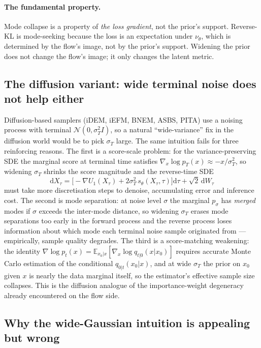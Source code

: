 \documentclass[11pt,letterpaper]{article}
\newcommand{\E}{\mathbb{E}}
\newcommand{\dd}{\mathrm{d}}
\theoremstyle{plain}
\begin{document}
\paragraph{The fundamental property.} Mode collapse is a property of
\emph{the loss gradient}, not the prior's support. Reverse-KL is mode-seeking
because the loss is an expectation under $\nu_\theta$, which is determined by
the flow's image, not by the prior's support. Widening the prior does not
change the flow's image; it only changes the latent metric.

\subsection{The diffusion variant: wide terminal noise does not help either}

Diffusion-based samplers (iDEM, iEFM, BNEM, ASBS, PITA) use a noising process
with terminal $\mathcal N(0,\sigma_T^2 I)$, so a natural ``wide-variance''
fix in the diffusion world would be to pick $\sigma_T$ large. The same
intuition fails for three reinforcing reasons. The first is a score-scale
problem: for the variance-preserving SDE the marginal score at terminal time
satisfies $\nabla_x\log p_T(x)\approx -x/\sigma_T^2$, so widening $\sigma_T$
shrinks the score magnitude and the reverse-time SDE
\[
  \dd X_\tau = \big[-\nabla U_1(X_\tau) + 2\sigma_T^2\,s_\theta(X_\tau,\tau)\big]\dd\tau + \sqrt{2}\,\dd W_\tau
\]
must take more discretisation steps to denoise, accumulating error and
inference cost. The second is mode separation: at noise level $\sigma$ the
marginal $p_\sigma$ has \emph{merged} modes if $\sigma$ exceeds the inter-mode
distance, so widening $\sigma_T$ erases mode separations too early in the
forward process and the reverse process loses information about which mode
each terminal noise sample originated from --- empirically, sample quality
degrades. The third is a score-matching weakening: the identity
$\nabla\log p_t(x) = \E_{x_0|x}[\nabla_x\log q_{t|0}(x|x_0)]$ requires
accurate Monte Carlo estimation of the conditional $q_{0|t}(x_0|x)$, and at
wide $\sigma_T$ the prior on $x_0$ given $x$ is nearly the data marginal
itself, so the estimator's effective sample size collapses. This is the
diffusion analogue of the importance-weight degeneracy already encountered
on the flow side.

\subsection{Why the wide-Gaussian intuition is appealing but wrong}
\end{document}
